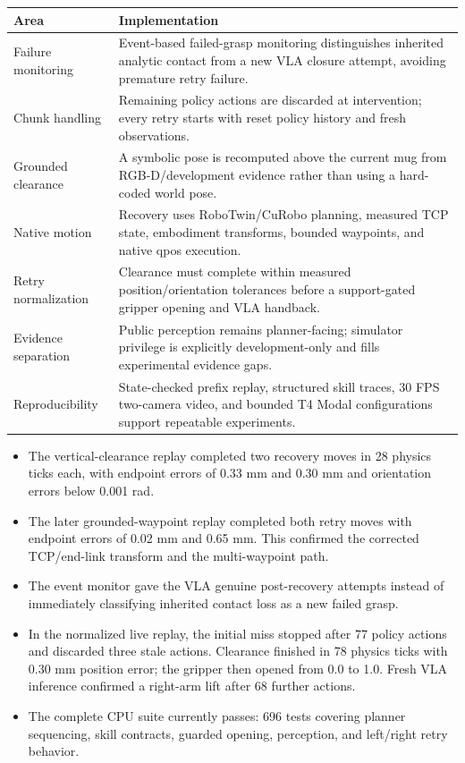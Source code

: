 \documentclass[10pt,a4paper]{article}
\newcommand{\heading}[1]{\vspace{1pt}{\large\bfseries\color{accent}#1}\par}
\begin{document}
\begin{tabular}{p{}p{}}
\toprule
\textbf{Area} & \textbf{Implementation} \\
\midrule
Failure monitoring & Event-based failed-grasp monitoring distinguishes inherited analytic contact from a new VLA closure attempt, avoiding premature retry failure. \\
Chunk handling & Remaining policy actions are discarded at intervention; every retry starts with reset policy history and fresh observations. \\
Grounded clearance & A symbolic pose is recomputed above the current mug from RGB-D/development evidence rather than using a hard-coded world pose. \\
Native motion & Recovery uses RoboTwin/CuRobo planning, measured TCP state, embodiment transforms, bounded waypoints, and native qpos execution. \\
Retry normalization & Clearance must complete within measured position/orientation tolerances before a support-gated gripper opening and VLA handback. \\
Evidence separation & Public perception remains planner-facing; simulator privilege is explicitly development-only and fills experimental evidence gaps. \\
Reproducibility & State-checked prefix replay, structured skill traces, 30 FPS two-camera video, and bounded T4 Modal configurations support repeatable experiments. \\
\bottomrule
\end{tabular}

\heading{Evidence so far}

\begin{itemize}
  \item The vertical-clearance replay completed two recovery moves in 28 physics
  ticks each, with endpoint errors of 0.33 mm and 0.30 mm and orientation errors
  below 0.001 rad.
  \item The later grounded-waypoint replay completed both retry moves with
  endpoint errors of 0.02 mm and 0.65 mm. This confirmed the corrected TCP/end-link
  transform and the multi-waypoint path.
  \item The event monitor gave the VLA genuine post-recovery attempts instead of
  immediately classifying inherited contact loss as a new failed grasp.
  \item In the normalized live replay, the initial miss stopped after 77 policy
  actions and discarded three stale actions. Clearance finished in 78 physics
  ticks with 0.30 mm position error; the gripper then opened from 0.0 to 1.0.
  Fresh VLA inference confirmed a right-arm lift after 68 further actions.
  \item The complete CPU suite currently passes: 696 tests covering planner
  sequencing, skill contracts, guarded opening, perception, and left/right retry behavior.
\end{itemize}
\end{document}
